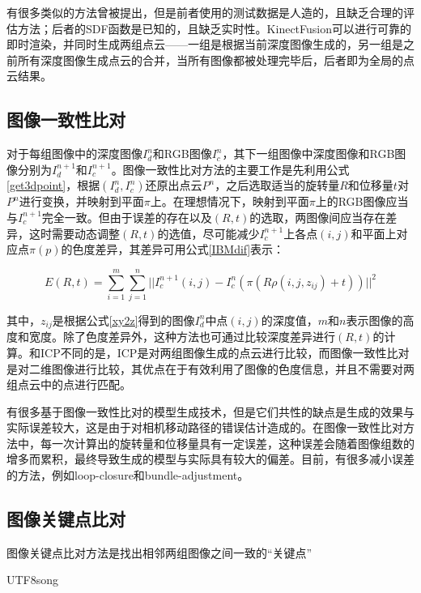 \documentclass{llncs}
\begin{document}
\begin{CJK}{UTF8}{song}
有很多类似的方法曾被提出\cite{DBLP:conf/cimaging/KubackiBBD12,DBLP:conf/eccv/RenR12}，但是前者使用的测试数据是人造的，且缺乏合理的评估方法；后者的SDF函数是已知的，且缺乏实时性。KinectFusion可以进行可靠的即时渲染，并同时生成两组点云——一组是根据当前深度图像生成的，另一组是之前所有深度图像生成点云的合并，当所有图像都被处理完毕后，后者即为全局的点云结果。


	\subsection{图像一致性比对}

对于每组图像中的深度图像$I^n_d$和RGB图像$I^n_c$，其下一组图像中深度图像和RGB图像分别为$I^{n+1}_d$和$I^{n+1}_c$。图像一致性比对方法的主要工作是先利用公式\ref{get3dpoint}，根据$(I^n_d,I^n_c)$还原出点云$P^n$，之后选取适当的旋转量$R$和位移量$t$对$P^n$进行变换，并映射到平面$\pi$上\cite{DBLP:conf/iccvw/SteinbruckerSC11}。在理想情况下，映射到平面$\pi$上的RGB图像应当与$I^{n+1}_c$完全一致。但由于误差的存在以及$(R,t)$的选取，两图像间应当存在差异，这时需要动态调整$(R,t)$的选值，尽可能减少$I^{n+1}_c$上各点$(i,j)$和平面上对应点$\pi(p)$的色度差异，其差异可用公式\ref{IBMdif}表示：

\begin{equation}
\label{IBMdif}
E(R,t) = \sum^m_{i=1}\sum^n_{j=1}||I^{n+1}_c(i,j)-I^n_c(\pi(R\rho(i,j,z_{ij})+t))||^2
\end{equation}

其中，$z_{ij}$是根据公式\ref{xy2z}得到的图像$I^n_d$中点$(i,j)$的深度值，$m$和$n$表示图像的高度和宽度。除了色度差异外，这种方法也可通过比较深度差异进行$(R,t)$的计算\cite{Kerl2013Large}。和ICP不同的是，ICP是对两组图像生成的点云进行比较，而图像一致性比对是对二维图像进行比较，其优点在于有效利用了图像的色度信息，并且不需要对两组点云中的点进行匹配。

有很多基于图像一致性比对的模型生成技术\cite{6631104,DBLP:conf/iros/KerlSC13}，但是它们共性的缺点是生成的效果与实际误差较大，这是由于对相机移动路径的错误估计造成的。在图像一致性比对方法中，每一次计算出的旋转量和位移量具有一定误差，这种误差会随着图像组数的增多而累积，最终导致生成的模型与实际具有较大的偏差。目前，有很多减小误差的方法，例如loop-closure\cite{DBLP:conf/eccv/KahlerPM16}和bundle-adjustment\cite{DBLP:journals/ijcv/UrbanWLH17}。

	\subsection{图像关键点比对}

图像关键点比对方法是找出相邻两组图像之间一致的“关键点”



%

\end{CJK}{UTF8}{song}
\end{document}
